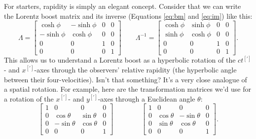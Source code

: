 \documentclass[12pt]{article}
\begin{document}
For starters, rapidity is simply an elegant concept. Consider that we can write the Lorentz boost matrix and its inverse (Equations \ref{eq:bm} and \ref{eq:im}) like this:
\begin{equation*}
\Lambda =
\begin{bmatrix}
\cosh{\phi} & -\sinh{\phi} & 0 & 0 \\
- \sinh{\phi} & \cosh{\phi} & 0 & 0 \\
0 & 0 & 1 & 0 \\
0 & 0 & 0 & 1
\end{bmatrix}
\qquad
\Lambda^{-1} =
\begin{bmatrix}
\cosh{\phi} & \sinh{\phi} & 0 & 0 \\
\sinh{\phi} & \cosh{\phi} & 0 & 0 \\
0 & 0 & 1 & 0 \\
0 & 0 & 0 & 1
\end{bmatrix} .
\end{equation*}
This allows us to understand a Lorentz boost as a hyperbolic rotation of the $ct^{[\prime]}$- and $x^{[\prime]}$-axes through the observers' relative rapidity (the hyperbolic angle between their four-velocities). Isn't that something? It's a very close analogue of a spatial rotation. For example, here are the transformation matrices we'd use for a rotation of the $x^{[\prime]}$- and $y^{[\prime]}$-axes through a Euclidean angle $\theta$:
\begin{equation*}
\begin{bmatrix}
1 & 0 & 0 & 0 \\
0 & \cos{\theta} & \sin{\theta} & 0 \\
0 & - \sin{\theta} & \cos{\theta} & 0 \\
0 & 0 & 0 & 1
\end{bmatrix}
\qquad \qquad
\begin{bmatrix}
1 & 0 & 0 & 0 \\
0 & \cos{\theta} & -\sin{\theta} & 0 \\
0 & \sin{\theta} & \cos{\theta} & 0 \\
0 & 0 & 0 & 1
\end{bmatrix} .
\end{equation*}
\end{document}
